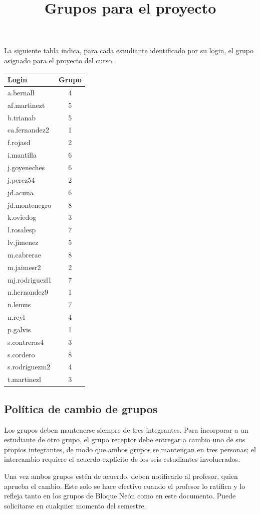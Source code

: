 \documentclass{doc}
\title{Grupos para el proyecto}
\begin{document}
\makedocheader

La siguiente tabla indica, para cada estudiante identificado por su login, el grupo asignado para el proyecto del curso.

\begin{center}
\begin{tabular}{lc}
    \toprule
    \textbf{Login} & \textbf{Grupo} \\
    \midrule
    a.bernall     & 4 \\
    af.martinezt  & 5 \\
    b.trianab     & 5 \\
    ca.fernandez2 & 1 \\
    f.rojasd      & 2 \\
    i.mantilla    & 6 \\
    j.goyeneches  & 6 \\
    j.perez54     & 2 \\
    jd.acuna      & 6 \\
    jd.montenegro & 8 \\
    k.oviedog     & 3 \\
    l.rosalesp    & 7 \\
    lv.jimenez    & 5 \\
    m.cabrerae    & 8 \\
    m.jaimesr2    & 2 \\
    mj.rodriguezl1 & 7 \\
    n.hernandez9  & 1 \\
    n.lemus       & 7 \\
    n.reyl        & 4 \\
    p.galvis      & 1 \\
    s.contreras4  & 3 \\
    s.cordero     & 8 \\
    s.rodriguezm2 & 4 \\
    t.martinezl   & 3 \\
    \bottomrule
\end{tabular}
\end{center}

\subsection{Política de cambio de grupos}
Los grupos deben mantenerse siempre de tres integrantes. Para incorporar a un estudiante de otro grupo, el grupo receptor debe entregar a cambio uno de sus propios integrantes, de modo que ambos grupos se mantengan en tres personas; el intercambio requiere el acuerdo explícito de los seis estudiantes involucrados.

Una vez ambos grupos estén de acuerdo, deben notificarlo al profesor, quien aprueba el cambio. Este solo se hace efectivo cuando el profesor lo ratifica y lo refleja tanto en los grupos de Bloque Neón como en este documento. Puede solicitarse en cualquier momento del semestre.
\end{document}
